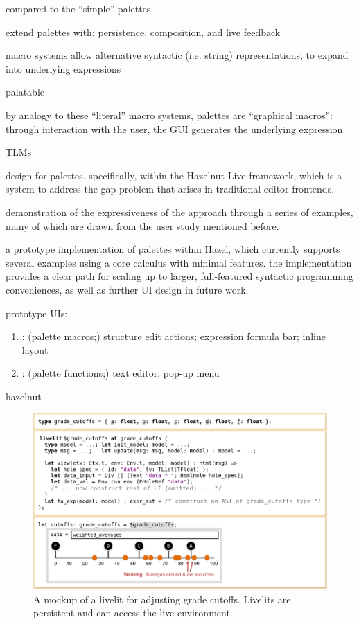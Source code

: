 


compared to the ``simple'' palettes

extend palettes with: persistence, composition, and live feedback

macro systems allow alternative syntactic (i.e. string) representations, to
expand into underlying expressions

palatable

by analogy to these ``literal'' macro systems, palettes are ``graphical
macros'': through interaction with the user, the GUI generates the underlying
expression.

TLMs~\cite{TLMs}




design for palettes. specifically, within the Hazelnut Live framework,
which is a system to address the gap problem that arises in traditional editor
frontends.

demonstration of the expressiveness of the approach through a series of
examples, many of which are drawn from the user study mentioned before.

a prototype implementation of palettes within Hazel, which currently
supports several examples using a core calculus with minimal features. the
implementation provides a clear path for scaling up to larger, full-featured
syntactic programming conveniences, as well as further UI design in future work.

prototype UIs:

  \begin{enumerate}
    \item \Hazel{}: (palette macros;) structure edit actions; expression formula bar; inline layout
    \item \sns{}: (palette functions;) text editor; pop-up menu
  \end{enumerate}

hazelnut~\citep{Hazelnut,HazelnutLive}



\begin{figure}[t!]
  \begin{center}
  \includegraphics[width=34pc]{cutoffs-mockup.png}\end{center}
  \caption{A mockup of a livelit for adjusting grade cutoffs. Livelits are persistent and can access the live environment.}
  \label{fig:cutoffs}
  \end{figure}
  